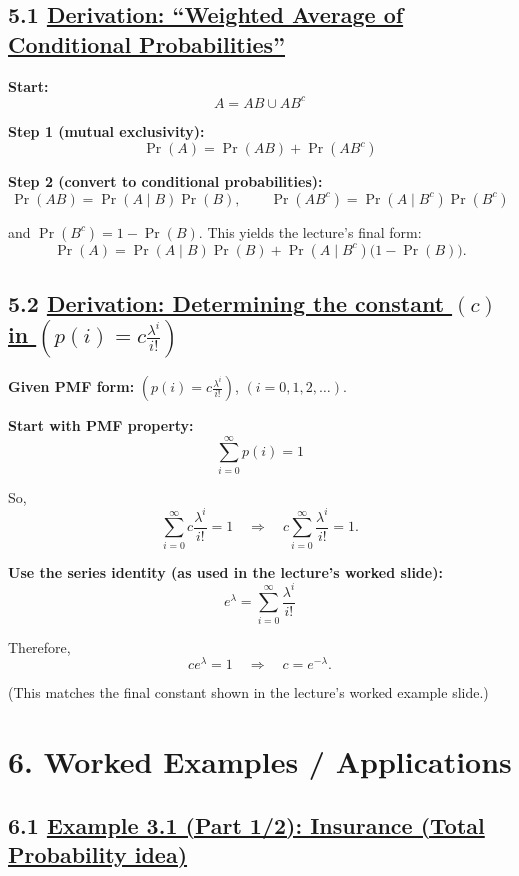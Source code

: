 \documentclass[11pt]{article}
\begin{document}
\vspace{0.5cm}
\subsection*{5.1 \underline{Derivation: “Weighted Average of Conditional Probabilities”}}

\textbf{Start:}
\[
A = AB \cup AB^c
\]

\textbf{Step 1 (mutual exclusivity):}
\[
\Pr(A)=\Pr(AB)+\Pr(AB^c)
\]

\textbf{Step 2 (convert to conditional probabilities):}
\[
\Pr(AB)=\Pr(A\mid B)\Pr(B),\qquad \Pr(AB^c)=\Pr(A\mid B^c)\Pr(B^c)
\]

and $\Pr(B^c)=1-\Pr(B)$. This yields the lecture’s final form:
\[
\Pr(A)=\Pr(A\mid B)\Pr(B)+\Pr(A\mid B^c)\bigl(1-\Pr(B)\bigr).
\]

\vspace{0.5cm}
\subsection*{5.2 \underline{Derivation: Determining the constant $(c)$ in $\left(p(i)=c\frac{\lambda^i}{i!}\right)$}}

\textbf{Given PMF form:} $\left(p(i)=c\frac{\lambda^i}{i!}\right)$, $(i=0,1,2,\dots)$.

\textbf{Start with PMF property:}
\[
\sum_{i=0}^{\infty}p(i)=1
\]

So,
\[
\sum_{i=0}^{\infty}c\frac{\lambda^i}{i!}=1
\quad\Rightarrow\quad
c\sum_{i=0}^{\infty}\frac{\lambda^i}{i!}=1.
\]

\textbf{Use the series identity (as used in the lecture’s worked slide):}
\[
e^\lambda=\sum_{i=0}^{\infty}\frac{\lambda^i}{i!}
\]

Therefore,
\[
c e^\lambda=1
\quad\Rightarrow\quad
c=e^{-\lambda}.
\]

(This matches the final constant shown in the lecture’s worked example slide.)

\vspace{1cm}
\section*{6. Worked Examples / Applications}

\vspace{0.5cm}
\subsection*{6.1 \underline{Example 3.1 (Part 1/2): Insurance (Total Probability idea)}}
\end{document}
